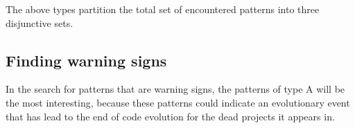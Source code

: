 \noindent
The above types partition the total set of encountered patterns into three
disjunctive sets.

\subsection{Finding warning signs}
In the search for patterns that are warning signs, the patterns of type A will
be the most interesting, because these patterns could indicate an evolutionary
event that has lead to the end of code evolution for the dead projects it
appears in.

\begin{comment}
- Execution of the research
- Phases, steps

This chapter reports on the execution of the research method as described in Chapter 3.

If the research has been divided into phases (e.g., using sub questions) the
phases are introduced, reported on and concluded individually. If needed this
Chapter could be split up to balance out the sizes of all Chapters.
An example Research Chapter is provided as Chapter 3 at Paul’s home
page\footnote{http://homepages.cwi.nl/~paulk/thesesMasterSoftwareEngineering/2006/ReneWiegers.pdf}.
\end{comment}
